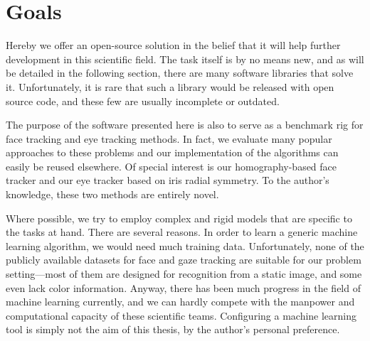 \chapter{Goals}

Hereby we offer an open-source solution in the belief that it will help further development in this scientific field.
The task itself is by no means new, and as will be detailed in the following section, there are many software libraries that solve it.
Unfortunately, it is rare that such a library would be released with open source code, and these few are usually incomplete or outdated.

The purpose of the software presented here is also to serve as a benchmark rig for face tracking and eye tracking methods.
In fact, we evaluate many popular approaches to these problems and our implementation of the algorithms can easily be reused elsewhere.
Of special interest is our homography-based face tracker and our eye tracker based on iris radial symmetry.
To the author's knowledge, these two methods are entirely novel.

Where possible, we try to employ complex and rigid models that are specific to the tasks at hand.
There are several reasons.
In order to learn a generic machine learning algorithm, we would need much training data.
Unfortunately, none of the publicly available datasets for face and gaze tracking are suitable for our problem setting---most of them are designed for recognition from a static image, and some even lack color information.
Anyway, there has been much progress in the field of machine learning currently, and we can hardly compete with the manpower and computational capacity of these scientific teams.
Configuring a machine learning tool is simply not the aim of this thesis, by the author's personal preference.
